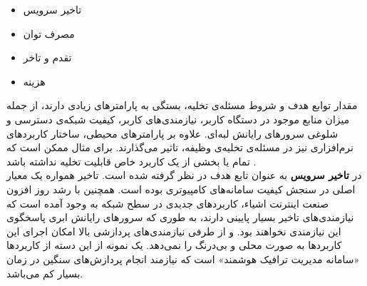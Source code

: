 \begin{multicols}{2}
	\begin{itemize}
		\item تاخیر سرویس
		\item مصرف توان
		\item تقدم و تاخر
		\item هزینه
	\end{itemize}
\end{multicols}
مقدار توابع هدف و شروط مسئله‌ی تخلیه، بستگی به پارامترهای زیادی دارند، از جمله میزان منابع موجود در دستگاه کاربر، نیازمندی‌های کاربر، کیفیت شبکه‌ی دسترسی و شلوغی سرورهای رایانش لبه‌ای. علاوه بر پارامترهای محیطی، ساختار کاربردهای نرم‌افزاری نیز در مسئله‌ی تخلیه‌ی وظیفه، تاثیر می‌گذارند. برای مثال ممکن است که تمام یا بخشی از یک کاربرد خاص قابلیت تخلیه نداشته باشد \Cite{mach}. \\

در \CurrentProject \textbf{تاخیر سرویس} به عنوان تابع هدف در نظر گرفته شده است. تاخیر همواره یک معیار اصلی در سنجش کیفیت سامانه‌های کامپیوتری بوده است. همچنین با رشد روز افزون صنعت اینترنت اشیاء، کاربردهای جدیدی در سطح شبکه به وجود آمده است که نیازمندی‌های تاخیر بسیار پایینی دارند، به طوری که سرورهای رایانش ابری پاسخگوی این نیازمندی نخواهند بود. و از طرفی نیازمندی‌های پردازشی بالا امکان اجرای این کاربردها به صورت محلی و بی‌درنگ را نمی‌دهد. یک نمونه از این دسته از کاربردها «سامانه مدیریت ترافیک هوشمند» است که نیازمند انجام پردازش‌های سنگین در زمان بسیار کم می‌باشد. \\

